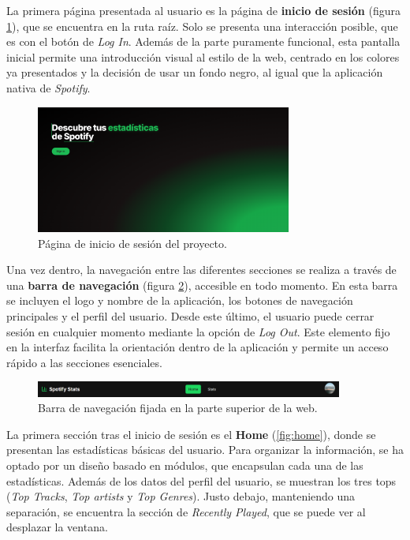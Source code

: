 La primera página presentada al usuario es la página de \textbf{inicio de sesión} (figura \ref{fig:login}), que se encuentra en la ruta raíz. Solo se presenta una interacción posible, que es con el botón de \textit{Log In}. Además de la parte puramente funcional, esta pantalla inicial permite una introducción visual al estilo de la web, centrado en los colores ya presentados y la decisión de usar un fondo negro, al igual que la aplicación nativa de \textit{Spotify}.

\begin{figure}[H]
    \centering
    \includegraphics[width=0.75\textwidth]{figures/capturas_ui/login.png}
    \vspace{0.3cm}
    \caption{Página de inicio de sesión del proyecto.}
    \label{fig:login}
\end{figure}

Una vez dentro, la navegación entre las diferentes secciones se realiza a través de una \textbf{barra de navegación} (figura \ref{fig:navbar}), accesible en todo momento. En esta barra se incluyen el logo y nombre de la aplicación, los botones de navegación principales y el perfil del usuario. Desde este último, el usuario puede cerrar sesión en cualquier momento mediante la opción de \textit{Log Out}. Este elemento fijo en la interfaz facilita la orientación dentro de la aplicación y permite un acceso rápido a las secciones esenciales.

\begin{figure}[H]
    \centering
    \includegraphics[width=0.9\textwidth]{figures/capturas_ui/navbar.png}
    \vspace{0.3cm}
    \caption{Barra de navegación fijada en la parte superior de la web.}
    \label{fig:navbar}
\end{figure}

La primera sección tras el inicio de sesión es el \textbf{Home} (\ref{fig:home}), donde se presentan las estadísticas básicas del usuario. Para organizar la información, se ha optado por un diseño basado en módulos, que encapsulan cada una de las estadísticas. Además de los datos del perfil del usuario, se muestran los tres tops (\textit{Top Tracks}, \textit{Top artists} y \textit{Top Genres}). Justo debajo, manteniendo una separación, se encuentra la sección de \textit{Recently Played}, que se puede ver al desplazar la ventana.

